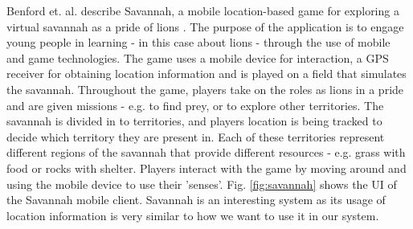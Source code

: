 Benford et. al. describe Savannah, a mobile location-based game for exploring a virtual savannah as a pride of lions \cite{Benford_Rowland_Hull_Reid_Morrison_Facer_Clayton_2004}. The purpose of the application is to engage young people in learning - in this case about lions - through the use of mobile and game technologies. The game uses a mobile device for interaction, a GPS receiver for obtaining location information and is played on a field that simulates the savannah. Throughout the game, players take on the roles as lions in a pride and are given missions - e.g. to find prey, or to explore other territories. The savannah is divided in to territories, and players location is being tracked to decide which territory they are present in. Each of these territories represent different regions of the savannah that provide different resources - e.g. grass with food or rocks with shelter. Players interact with the game by moving around and using the mobile device to use their 'senses'. Fig. \ref{fig:savannah} shows the UI of the Savannah mobile client. Savannah is an interesting system as its usage of location information is very similar to how we want to use it in our system.

